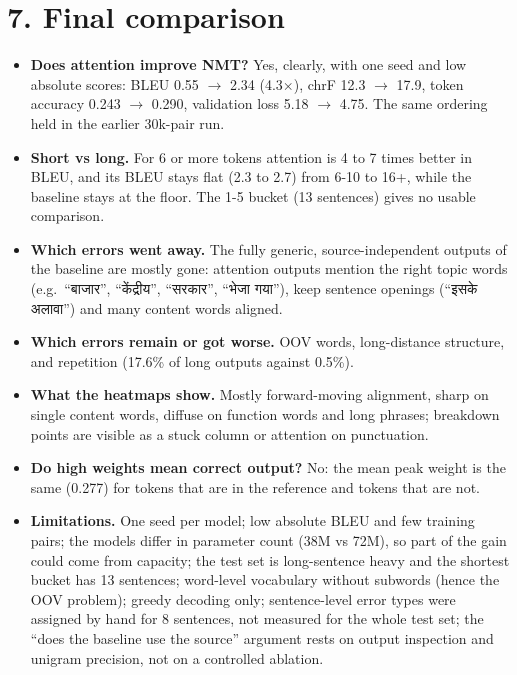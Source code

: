 \documentclass[10pt,a4paper]{article}
\DeclareRobustCommand{\hi}[1]{{\hindifont #1}}
\providecommand{\tightlist}{\setlength{\itemsep}{0pt}\setlength{\parskip}{0pt}}
\begin{document}
\hypertarget{final-comparison}{%
\section{7. Final comparison}\label{final-comparison}}

\begin{itemize}
\tightlist
\item
  \textbf{Does attention improve NMT?} Yes, clearly, with one seed and low absolute scores: BLEU 0.55 \ensuremath{\rightarrow} 2.34 (4.3\ensuremath{\times}), chrF 12.3 \ensuremath{\rightarrow} 17.9, token accuracy 0.243 \ensuremath{\rightarrow} 0.290, validation loss 5.18 \ensuremath{\rightarrow} 4.75. The same ordering held in the earlier 30k-pair run.
\item
  \textbf{Short vs long.} For 6 or more tokens attention is 4 to 7 times better in BLEU, and its BLEU stays flat (2.3 to 2.7) from 6-10 to 16+, while the baseline stays at the floor. The 1-5 bucket (13 sentences) gives no usable comparison.
\item
  \textbf{Which errors went away.} The fully generic, source-independent outputs of the baseline are mostly gone: attention outputs mention the right topic words (e.g.~``\hi{बाजार}'', ``\hi{केंद्रीय}'', ``\hi{सरकार}'', ``\hi{भेजा गया}''), keep sentence openings (``\hi{इसके अलावा}'') and many content words aligned.
\item
  \textbf{Which errors remain or got worse.} OOV words, long-distance structure, and repetition (17.6\% of long outputs against 0.5\%).
\item
  \textbf{What the heatmaps show.} Mostly forward-moving alignment, sharp on single content words, diffuse on function words and long phrases; breakdown points are visible as a stuck column or attention on punctuation.
\item
  \textbf{Do high weights mean correct output?} No: the mean peak weight is the same (0.277) for tokens that are in the reference and tokens that are not.
\item
  \textbf{Limitations.} One seed per model; low absolute BLEU and few training pairs; the models differ in parameter count (38M vs 72M), so part of the gain could come from capacity; the test set is long-sentence heavy and the shortest bucket has 13 sentences; word-level vocabulary without subwords (hence the OOV problem); greedy decoding only; sentence-level error types were assigned by hand for 8 sentences, not measured for the whole test set; the ``does the baseline use the source'' argument rests on output inspection and unigram precision, not on a controlled ablation.
\end{itemize}
\end{document}

